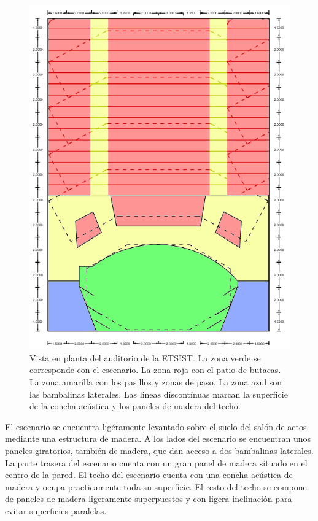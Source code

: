 \documentclass[11pt,a4paper,twoside]{book}
\begin{document}
 			\begin{figure}
				\includegraphics[scale=0.6]{../imagenes/auditorioColor.png}
				\centering
				\caption{Vista en planta del auditorio de la ETSIST. La zona verde se corresponde con el escenario. La zona roja con el patio de butacas. La zona amarilla con los pasillos y zonas de paso. La zona azul son las bambalinas laterales. Las lineas discontínuas marcan la superficie de la concha acústica y los paneles de madera del techo.}
				\label{fig:auditorio}
			\end{figure}
 
 			El escenario se encuentra ligéramente levantado sobre el suelo del salón de actos mediante una estructura de madera. A los lados del escenario se encuentran unos paneles giratorios, también de madera, que dan acceso a dos bambalinas laterales. La parte trasera del escenario cuenta con un gran panel de madera situado en el centro de la pared. El techo del escenario cuenta con una concha acústica de madera y ocupa practicamente toda su superficie. El resto del techo se compone de paneles de madera ligeramente superpuestos y con ligera inclinación para evitar superficies paralelas.
 
\end{document}
